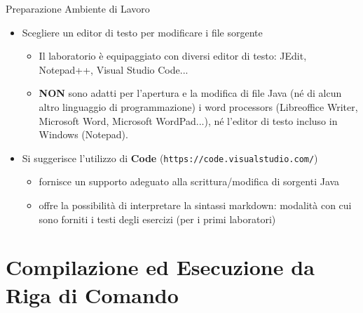 \documentclass[presentation]{beamer}
\begin{document}
\begin{frame}{Preparazione Ambiente di Lavoro}
    \begin{itemize}
        \item Scegliere un editor di testo per modificare i file sorgente
        \begin{itemize}
            \item Il laboratorio è equipaggiato con diversi editor di testo: JEdit, Notepad++, Visual Studio Code...
            \item \textbf{NON} sono adatti per l'apertura e la modifica di file Java
            (né di alcun altro linguaggio di programmazione) i word processors (Libreoffice Writer, Microsoft Word, Microsoft WordPad...), né l'editor di testo incluso in Windows (Notepad).
        \end{itemize}
        \item Si suggerisce l'utilizzo di \textbf{Code} (\texttt{https://code.visualstudio.com/})
        \begin{itemize}
            \item fornisce un supporto adeguato alla scrittura/modifica di sorgenti Java
            \item offre la possibilità di interpretare la sintassi markdown: modalità con cui sono forniti i testi degli esercizi (per i primi laboratori)
        \end{itemize}
    \end{itemize}
\end{frame}

\section{Compilazione ed Esecuzione da Riga di Comando}

\end{document}
